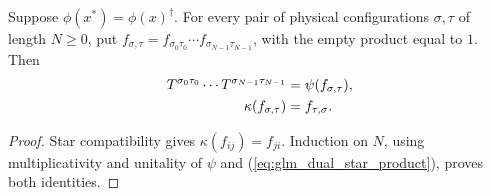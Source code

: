 \begin{lemma}
    \label{thm:glm_dual_representation_words}
    \leanok
    Suppose $\phi(x^*)=\phi(x)^\dagger$. For every pair of physical
    configurations $\sigma,\tau$ of length $N\geq0$, put
    $f_{\sigma,\tau}=f_{\sigma_0\tau_0}\cdots f_{\sigma_{N-1}\tau_{N-1}}$,
    with the empty product equal to $1$. Then
    \begin{align}
        T^{\sigma_0\tau_0}\cdots T^{\sigma_{N-1}\tau_{N-1}}
                                & =\psi(f_{\sigma,\tau}), \notag \\
        \kappa(f_{\sigma,\tau}) & =f_{\tau,\sigma}.
        \label{eq:glm_dual_representation_words}
    \end{align}
\end{lemma}
\begin{proof}
    \leanok
    Star compatibility gives $\kappa(f_{ij})=f_{ji}$.
    Induction on $N$, using multiplicativity and unitality of $\psi$
    and (\ref{eq:glm_dual_star_product}), proves both identities.
\end{proof}

